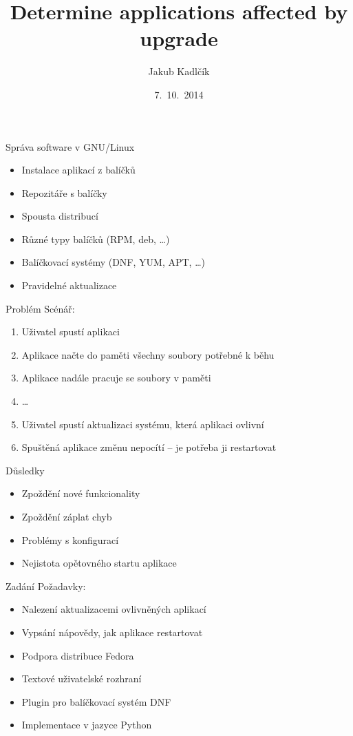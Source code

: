 \documentclass{beamer}
\title[tracer]{Determine applications affected by upgrade}
\author{Jakub Kadlčík}
\institute[UP]{Univerzita Palackého v Olomouci}
\date{7.~10.~2014}
\begin{document}
	\begin{frame}
		\titlepage
	\end{frame}

	\begin{frame}{Správa software v GNU/Linux}
		\begin{itemize}
			\item Instalace aplikací z balíčků
			\item Repozitáře s balíčky
			\item Spousta distribucí
			\item Různé typy balíčků (RPM, deb, \dots)
			\item Balíčkovací systémy (DNF, YUM, APT, \dots)
			\item Pravidelné aktualizace
		\end{itemize}
	\end{frame}

	\begin{frame}{Problém}
		Scénář:
		\begin{enumerate}
			\item Uživatel spustí aplikaci
			\item Aplikace načte do paměti všechny soubory potřebné k běhu
			\item Aplikace nadále pracuje se soubory v paměti
			\item \dots
			\item Uživatel spustí aktualizaci systému, která aplikaci ovlivní
			\item Spuštěná aplikace změnu nepocítí -- je potřeba ji restartovat
		\end{enumerate}
	\end{frame}

	\begin{frame}{Důsledky}
		\begin{itemize}
			\item Zpoždění nové funkcionality
			\item Zpoždění záplat chyb
			\item Problémy s konfigurací
			\item Nejistota opětovného startu aplikace
		\end{itemize}
	\end{frame}

	\begin{frame}{Zadání}
		Požadavky:
		\begin{itemize}
			\item Nalezení aktualizacemi ovlivněných aplikací
			\item Vypsání nápovědy, jak aplikace restartovat
		\end{itemize}

		\begin{itemize}
			\item Podpora distribuce Fedora
			\item Textové uživatelské rozhraní
			\item Plugin pro balíčkovací systém DNF
			\item Implementace v jazyce Python
		\end{itemize}
	\end{frame}
\end{document}
